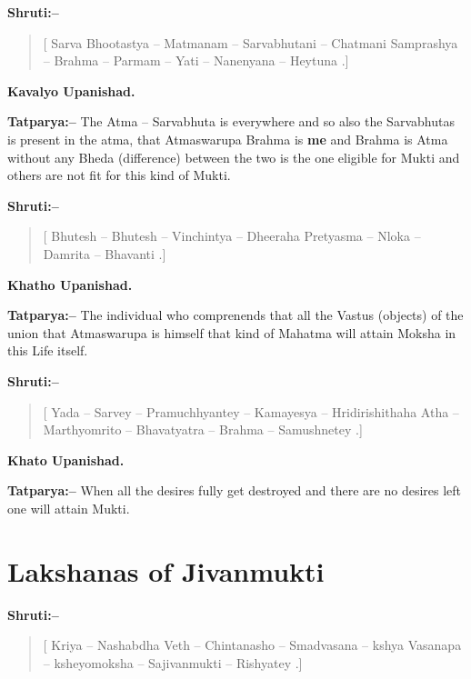 \textbf{Shruti:–}

\begin{verse}
[ Sarva Bhootastya – Matmanam – Sarvabhutani – Chatmani  Samprashya – Brahma – Parmam – Yati – Nanenyana – Heytuna .]
\end{verse}

\begin{flushright}
\textbf{Kavalyo Upanishad.}
\end{flushright}

\textbf{Tatparya:–} The Atma – Sarvabhuta is everywhere and so also the Sarvabhutas is present in the atma, that Atmaswarupa Brahma is \textbf{me} and Brahma is Atma without any Bheda (difference) between the two is the one eligible for Mukti and others are not fit for this kind of Mukti.

\textbf{Shruti:–}

\begin{verse}
[ Bhutesh – Bhutesh – Vinchintya – Dheeraha  Pretyasma – Nloka – Damrita – Bhavanti .]
\end{verse}

\begin{flushright}
\textbf{Khatho Upanishad.}
\end{flushright}

\textbf{Tatparya:–} The individual who comprenends that all the Vastus (objects) of the union that Atmaswarupa is himself that kind of Mahatma will attain Moksha in this Life itself.

\textbf{Shruti:–}

\begin{verse}
[ Yada – Sarvey – Pramuchhyantey – Kamayesya – Hridirishithaha  Atha – Marthyomrito – Bhavatyatra – Brahma – Samushnetey .]
\end{verse}

\begin{flushright}
\textbf{Khato Upanishad.}
\end{flushright}

\textbf{Tatparya:–} When all the desires fully get destroyed and there are no desires left one will attain Mukti.

\chapter{Lakshanas of Jivanmukti}

\textbf{Shruti:–}

\begin{verse}
[ Kriya – Nashabdha Veth – Chintanasho – Smadvasana – kshya  Vasanapa – ksheyomoksha – Sajivanmukti – Rishyatey .]
\end{verse}

